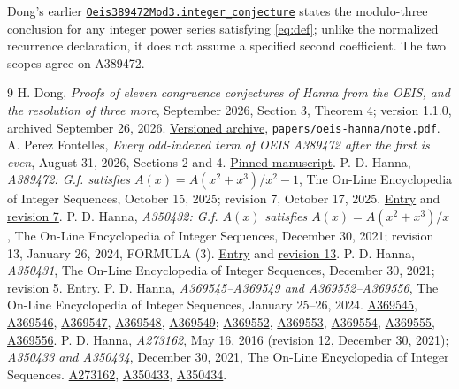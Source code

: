 \documentclass[11pt]{article}
\begin{document}
Dong's earlier
\href{https://github.com/Horace-Maxwell/ai4math-results/blob/4c9a4c2b6945ed4f12ba8bdd66c398869081b4f6/lean/Research/Oeis389472Mod3.lean}{\texttt{Oeis389472Mod3.integer\_conjecture}}
states the modulo-three conclusion for any integer power series satisfying
\eqref{eq:def}; unlike the normalized recurrence declaration, it does not
assume a specified second coefficient. The two scopes agree on A389472.

\begin{thebibliography}{9}
H. Dong, \emph{Proofs of eleven congruence conjectures of Hanna from the
OEIS, and the resolution of three more}, September 2026,
Section 3, Theorem 4; version 1.1.0, archived September 26, 2026.
\href{https://doi.org/10.5281/zenodo.22970816}{Versioned archive},
\texttt{papers/oeis-hanna/note.pdf}.
A. Perez Fontelles, \emph{Every odd-indexed term of OEIS A389472 after
the first is even}, August 31, 2026, Sections 2 and 4.
\href{https://github.com/astrafala/Conjectures/blob/58cf4596af4541652fb191e177ef9b7771388d53/paper-sources/01001-01500/01042-PROOF.tex}{Pinned manuscript}.
P. D. Hanna, \emph{A389472: G.f. satisfies
$A(x)=A(x^2+x^3)/x^2-1$}, The On-Line Encyclopedia of Integer Sequences,
October 15, 2025; revision 7, October 17, 2025.
\href{https://oeis.org/A389472}{Entry} and
\href{https://oeis.org/history/view?seq=A389472\&v=7}{revision 7}.
P. D. Hanna, \emph{A350432: G.f. $A(x)$ satisfies
$A(x)=A(x^2+x^3)/x$}, The On-Line Encyclopedia of Integer Sequences,
December 30, 2021; revision 13, January 26, 2024, FORMULA (3).
\href{https://oeis.org/A350432}{Entry} and
\href{https://oeis.org/history/view?seq=A350432\&v=13}{revision 13}.
P. D. Hanna, \emph{A350431}, The On-Line Encyclopedia of Integer Sequences,
December 30, 2021; revision 5.
\href{https://oeis.org/A350431}{Entry}.
P. D. Hanna, \emph{A369545--A369549 and A369552--A369556},
The On-Line Encyclopedia of Integer Sequences, January 25--26, 2024.
\href{https://oeis.org/A369545}{A369545},
\href{https://oeis.org/A369546}{A369546},
\href{https://oeis.org/A369547}{A369547},
\href{https://oeis.org/A369548}{A369548},
\href{https://oeis.org/A369549}{A369549};
\href{https://oeis.org/A369552}{A369552},
\href{https://oeis.org/A369553}{A369553},
\href{https://oeis.org/A369554}{A369554},
\href{https://oeis.org/A369555}{A369555},
\href{https://oeis.org/A369556}{A369556}.
P. D. Hanna, \emph{A273162}, May 16, 2016 (revision 12,
December 30, 2021); \emph{A350433 and A350434}, December 30, 2021,
The On-Line Encyclopedia of Integer Sequences.
\href{https://oeis.org/A273162}{A273162},
\href{https://oeis.org/A350433}{A350433},
\href{https://oeis.org/A350434}{A350434}.
\end{thebibliography}
\end{document}
